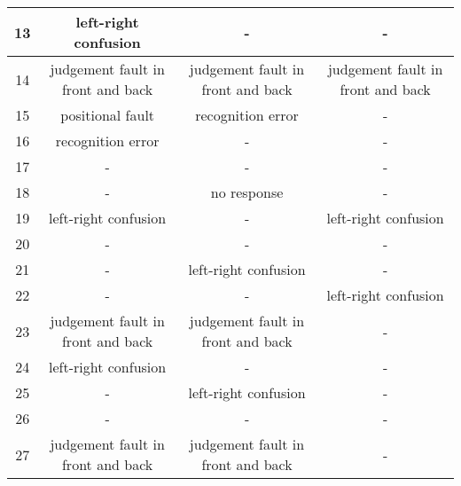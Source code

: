 \begin{table*}[ht]
{\begin{tabular}{|c|c|c|c|}
        13              & left-right confusion              & -                                 & -                                 \\ \hline
        14              & judgement fault in front and back & judgement fault in front and back & judgement fault in front and back \\ \hline
        15              & positional fault                  & recognition error                 & -                                 \\ \hline
        16              & recognition error                 & -                                 & -                                 \\ \hline
        17              & -                                 & -                                 & -                                 \\ \hline
        18              & -                                 & no response                       & -                                 \\ \hline
        19              & left-right confusion              & -                                 & left-right confusion              \\ \hline
        20              & -                                 & -                                 & -                                 \\ \hline
        21              & -                                 & left-right confusion              & -                                 \\ \hline
        22              & -                                 & -                                 & left-right confusion              \\ \hline
        23              & judgement fault in front and back & judgement fault in front and back & -                                 \\ \hline
        24              & left-right confusion              & -                                 & -                                 \\ \hline
        25              & -                                 & left-right confusion              & -                                 \\ \hline
        26              & -                                 & -                                 & -                                 \\ \hline
        27              & judgement fault in front and back & judgement fault in front and back & -                                 \\ \hline

\end{tabular}}
\end{table*}
